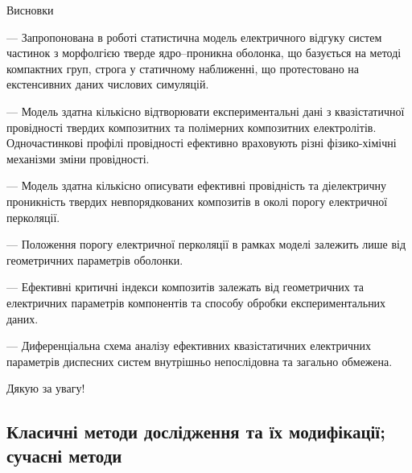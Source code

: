 \documentclass[10pt]{beamer}
\begin{document}
\begin{frame}{Висновки}
\footnotesize

--- Запропонована в роботі статистична модель електричного відгуку систем частинок з морфолгією тверде ядро--проникна оболонка, що базується на методі компактних груп, строга у статичному наближенні, що протестовано на екстенсивних даних числових симуляцій. 

--- Модель здатна кількісно відтворювати експериментальні дані з квазістатичної провідності твердих композитних та полімерних композитних електролітів. Одночастинкові профілі провідності ефективно враховують різні фізико-хімічні механізми зміни провідності.

--- Модель здатна кількісно описувати ефективні провідність та діелектричну проникність твердих невпорядкованих композитів в околі порогу електричної перколяції. 

--- Положення порогу електричної перколяції в рамках моделі залежить лише від геометричних параметрів оболонки.

--- Ефективні критичні індекси композитів залежать від геометричних та електричних параметрів компонентів та способу обробки експериментальних даних.

--- Диференціальна схема аналізу ефективних квазістатичних електричних параметрів диспесних систем внутрішньо непослідовна та загально обмежена.

\end{frame}


{
\begin{frame}[standout]
  Дякую за увагу!
\end{frame}
}

\appendix

\subsection{Класичні методи дослідження та їх модифікації; сучасні методи}
\end{document}
